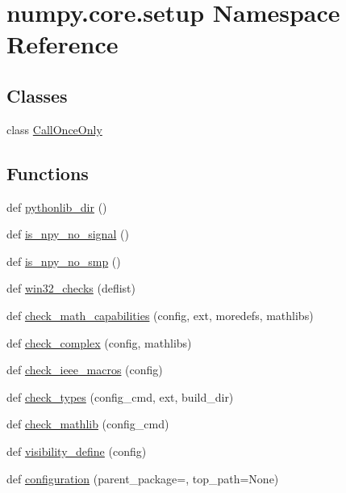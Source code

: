\hypertarget{namespacenumpy_1_1core_1_1setup}{}\section{numpy.\+core.\+setup Namespace Reference}
\label{namespacenumpy_1_1core_1_1setup}
\subsection*{Classes}
\begin{DoxyCompactItemize}
\item 
class \hyperlink{classnumpy_1_1core_1_1setup_1_1CallOnceOnly}{Call\+Once\+Only}
\end{DoxyCompactItemize}
\subsection*{Functions}
\begin{DoxyCompactItemize}
\item 
def \hyperlink{namespacenumpy_1_1core_1_1setup_aa5dc208313639a5502fe802cfaf5091a}{pythonlib\+\_\+dir} ()
\item 
def \hyperlink{namespacenumpy_1_1core_1_1setup_a76bc42644ebe3da66193e41da47e0537}{is\+\_\+npy\+\_\+no\+\_\+signal} ()
\item 
def \hyperlink{namespacenumpy_1_1core_1_1setup_a8d5e1bed5db67717e8de9597cd53d402}{is\+\_\+npy\+\_\+no\+\_\+smp} ()
\item 
def \hyperlink{namespacenumpy_1_1core_1_1setup_a13de468764d4414e2994466d67bbd992}{win32\+\_\+checks} (deflist)
\item 
def \hyperlink{namespacenumpy_1_1core_1_1setup_a7c7012cf448013380c4241f260ab3c21}{check\+\_\+math\+\_\+capabilities} (config, ext, moredefs, mathlibs)
\item 
def \hyperlink{namespacenumpy_1_1core_1_1setup_ac920fc35f337f94fcf120492b6567f4d}{check\+\_\+complex} (config, mathlibs)
\item 
def \hyperlink{namespacenumpy_1_1core_1_1setup_a5535df80d9881c89c7393b422ba1debd}{check\+\_\+ieee\+\_\+macros} (config)
\item 
def \hyperlink{namespacenumpy_1_1core_1_1setup_a49a6aa24f83633a4d0397fd0c8f36d6e}{check\+\_\+types} (config\+\_\+cmd, ext, build\+\_\+dir)
\item 
def \hyperlink{namespacenumpy_1_1core_1_1setup_a281a0126dc2afd81ea42799ac978d9e2}{check\+\_\+mathlib} (config\+\_\+cmd)
\item 
def \hyperlink{namespacenumpy_1_1core_1_1setup_a51a4d5fdb211a8d1fa6cd7911dad7b49}{visibility\+\_\+define} (config)
\item 
def \hyperlink{namespacenumpy_1_1core_1_1setup_a0175aae3c69662f3b8877573ca4d2aa1}{configuration} (parent\+\_\+package=\textquotesingle{}\textquotesingle{}, top\+\_\+path=None)
\end{DoxyCompactItemize}
